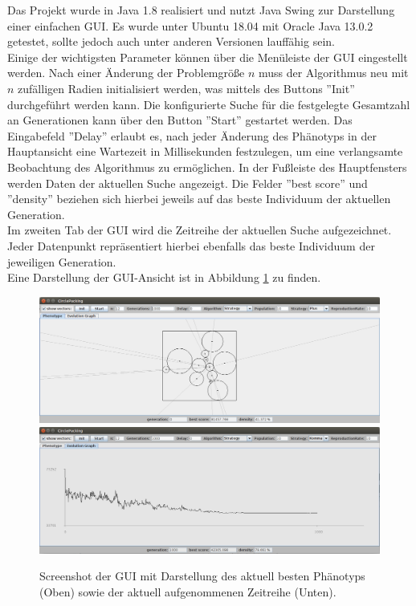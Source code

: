 \documentclass[twoside,bibtotoc]{report}
\begin{document}
Das Projekt wurde in Java 1.8 realisiert und nutzt Java Swing zur Darstellung einer einfachen \gls{GUI}.
Es wurde unter Ubuntu 18.04 mit Oracle Java 13.0.2 getestet, sollte jedoch auch unter anderen Versionen lauffähig sein.\\

Einige der wichtigsten Parameter können über die Menüleiste der \gls{GUI} eingestellt werden.
Nach einer Änderung der Problemgröße $n$ muss der Algorithmus neu mit $n$ zufälligen Radien initialisiert werden, was mittels des Buttons ''Init'' durchgeführt werden kann.
Die konfigurierte Suche für die festgelegte Gesamtzahl an Generationen kann über den Button ''Start'' gestartet werden.
Das Eingabefeld ''Delay'' erlaubt es, nach jeder Änderung des Phänotyps in der Hauptansicht eine Wartezeit in Millisekunden festzulegen, um eine verlangsamte Beobachtung des Algorithmus zu ermöglichen.
In der Fußleiste des Hauptfensters werden Daten der aktuellen Suche angezeigt.
Die Felder ''best score'' und ''density'' beziehen sich hierbei jeweils auf das beste Individuum der aktuellen Generation.\\

Im zweiten Tab der \gls{GUI} wird die Zeitreihe der aktuellen Suche aufgezeichnet.
Jeder Datenpunkt repräsentiert hierbei ebenfalls das beste Individuum der jeweiligen Generation.\\

Eine Darstellung der \gls{GUI}-Ansicht ist in Abbildung \ref{fig:gui} zu finden.

\begin{figure}[h]
 \centering
 \includegraphics [width=1\textwidth]{Bilder/gui.png} \\
 \includegraphics [width=1\textwidth]{Bilder/gui2.png}
 \caption{
 	Screenshot der \gls{GUI} mit Darstellung des aktuell besten Phänotyps (Oben)
 	sowie der aktuell aufgenommenen Zeitreihe (Unten).
 	}
 \label{fig:gui}
\end{figure}
\end{document}
